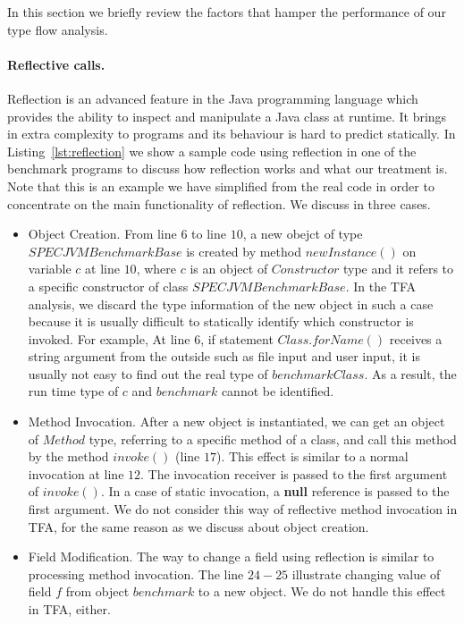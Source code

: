 \documentclass{fac}
\begin{document}
In this section we briefly review the factors that hamper the performance of our type flow analysis.

\paragraph{Reflective calls.} Reflection is an advanced feature in the Java programming language which provides the ability to inspect and manipulate a Java class at runtime. It brings in extra complexity to programs and its behaviour is hard to predict statically. In Listing~\ref{lst:reflection} we show a sample code using reflection in one of the benchmark programs to discuss how reflection works and what our treatment is. Note that this is an example we have simplified from the real code in order to concentrate on the main functionality of reflection. We discuss in three cases.
\begin{itemize}
\item Object Creation.
From line $6$ to line $10$, a new obejct of type $SPECJVMBenchmarkBase$ is created by method $newInstance()$ on variable $c$ at line $10$, where $c$ is an object of $Constructor$ type and it refers to a specific constructor of class $SPECJVMBenchmarkBase$. In the TFA analysis, we discard the type information of the new object in such a case because it is usually difficult to statically identify which constructor is invoked. For example, At line $6$, if statement $Class.forName()$ receives a string argument from the outside such as file input and user input, it is usually not easy to find out the real type of $benchmarkClass$. As a result, the run time type of $c$ and $benchmark$ cannot be identified.
\item Method Invocation.
After a new object is instantiated, we can get an object of $Method$ type, referring to a specific method of a class, and call this method by the method $invoke()$ (line $17$). This effect is similar to a normal invocation at line $12$. The invocation receiver is passed to the first argument of $invoke()$. In a case of static invocation, a \textbf{null} reference is passed to the first argument. We do not consider this way of reflective method invocation in TFA, for the same reason as we discuss about object creation.
\item Field Modification.
The way to change a field using reflection is similar to processing method invocation. The line $24-25$ illustrate changing value of field $f$ from object $benchmark$ to a new object. %
We do not handle this effect in TFA, either.
\end{itemize}
\end{document}
